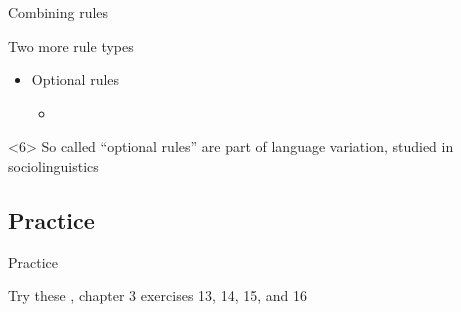 \documentclass{beamer}
\newcommand{\subonefour}{Combining rules}
\newcommand{\subonesix}{Practice}
\begin{document}
\begin{frame}{\subonefour}
{\begin{block}{Two more rule types}
\begin{itemize}
              \item \alert{Optional rules}
              \begin{itemize}
                \item 
              \end{itemize}
            \end{itemize}
          \end{block}
          \begin{alertblock}<6>{}
            So called ``optional rules'' are part of language variation, studied in sociolinguistics
          \end{alertblock}
        }
      \end{frame}

    \subsection{\subonesix}
      \begin{frame}{\subonesix}
        \begin{block}{Try these}
          \textcite{dawson_language_2016}, chapter 3 exercises 13, 14, 15, and 16
        \end{block}
      \end{frame}
  
\end{document}
